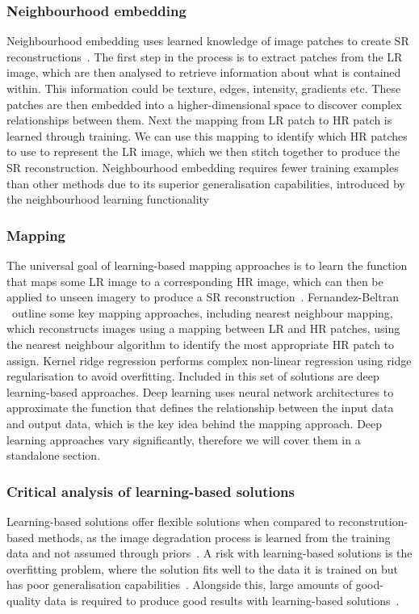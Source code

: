 \subsubsection{Neighbourhood embedding}
Neighbourhood embedding uses learned knowledge of image patches to create SR reconstructions~\cite{neighbourhoodEmbedding}. The first step in the process is to extract patches from the LR image, which are then analysed to retrieve information about what is contained within. This information could be texture, edges, intensity, gradients etc. These patches are then embedded into a higher-dimensional space to discover complex relationships between them. Next the mapping from LR patch to HR patch is learned through training. We can use this mapping to identify which HR patches to use to represent the LR image, which we then stitch together to produce the SR reconstruction. Neighbourhood embedding requires fewer training examples than other methods due to its superior generalisation capabilities, introduced by the neighbourhood learning functionality~\cite{neighbourhoodEmbedding}

\subsubsection{Mapping}
The universal goal of learning-based mapping approaches is to learn the function that maps some LR image to a corresponding HR image, which can then be applied to unseen imagery to produce a SR reconstruction~\cite{superResRemoteSensingOverview}. Fernandez-Beltran \etal\ outline some key mapping approaches, including nearest neighbour mapping, which reconstructs images using a mapping between LR and HR patches, using the nearest neighbour algorithm to identify the most appropriate HR patch to assign. Kernel ridge regression performs complex non-linear regression using ridge regularisation to avoid overfitting. Included in this set of solutions are deep learning-based approaches. Deep learning uses neural network architectures to approximate the function that defines the relationship between the input data and output data, which is the key idea behind the mapping approach. Deep learning approaches vary significantly, therefore we will cover them in a standalone section.

\subsubsection{Critical analysis of learning-based solutions}
Learning-based solutions offer flexible solutions when compared to reconstrution-based methods, as the image degradation process is learned from the training data and not assumed through priors~\cite{neighbourhoodEmbedding}. A risk with learning-based solutions is the overfitting problem, where the solution fits well to the data it is trained on but has poor generalisation capabilities~\cite{overfitting}. Alongside this, large amounts of good-quality data is required to produce good results with learning-based solutions~\cite{superResRemoteSensingOverview}.

